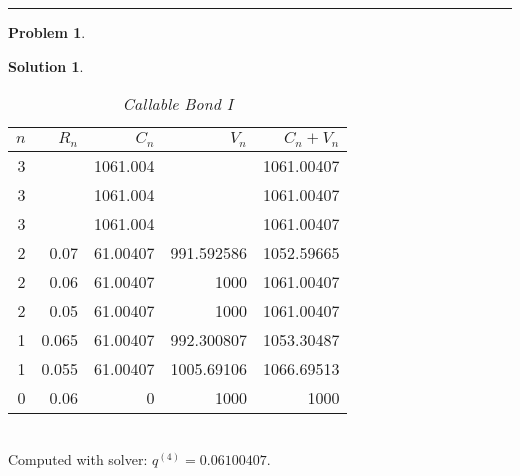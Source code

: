 \documentclass[a4paper, 10pt]{article}
\renewcommand{\arraystretch}{1.4}
\theoremstyle{definition}
\newtheorem{problem}{Problem}
\theoremstyle{hSol}
\newtheorem*{solution}{Solution}
\begin{document}
\noindent\rule{16cm}{0.4pt}

\begin{problem} 
\end{problem}
\begin{solution} ~\\
\begin{table}[H]
  \centering
  \caption{\textit{Callable Bond I}}
  \vspace{-7pt}
  \def\arraystretch{1.15}
    \begin{tabular}{|r|rrrr|}
    \hline
    $n$ & $R_n$ & $C_n$ & $V_n$ & $C_n+V_n$\\ 
    \hline
    3     &       & 1061.004 &       & 1061.00407 \\
    3     &       & 1061.004 &       & 1061.00407 \\
    3     &       & 1061.004 &       & 1061.00407 \\
    \hline
    2     & 0.07  & 61.00407 & 991.592586 & 1052.59665 \\
    2     & 0.06  & 61.00407 & 1000  & 1061.00407 \\
    2     & 0.05  & 61.00407 & 1000  & 1061.00407 \\
    \hline
    1     & 0.065 & 61.00407 & 992.300807 & 1053.30487 \\
    1     & 0.055 & 61.00407 & 1005.69106 & 1066.69513 \\
    \hline
    0     & 0.06  & 0     & 1000  & 1000 \\
    \hline
    \end{tabular}%
  \label{tab:cb1}%
\end{table}%
~\\
Computed with solver: $q^{(4)} = 0.06100407$.


\end{solution}
\end{document}
